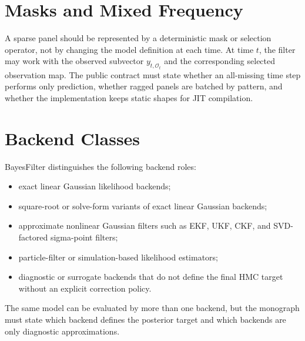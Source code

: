 \section{Masks and Mixed Frequency}
\label{sec:bf-masks-mixed-frequency-contract}

A sparse panel should be represented by a deterministic mask or selection
operator, not by changing the model definition at each time.  At time $t$, the
filter may work with the observed subvector $y_{t,\mathcal{O}_t}$ and the
corresponding selected observation map.  The public contract must state whether
an all-missing time step performs only prediction, whether ragged panels are
batched by pattern, and whether the implementation keeps static shapes for JIT
compilation.

\section{Backend Classes}
\label{sec:bf-backend-classes}

BayesFilter distinguishes the following backend roles:
\begin{itemize}
  \item exact linear Gaussian likelihood backends;
  \item square-root or solve-form variants of exact linear Gaussian backends;
  \item approximate nonlinear Gaussian filters such as EKF, UKF, CKF, and
    SVD-factored sigma-point filters;
  \item particle-filter or simulation-based likelihood estimators;
  \item diagnostic or surrogate backends that do not define the final HMC
    target without an explicit correction policy.
\end{itemize}
The same model can be evaluated by more than one backend, but the monograph
must state which backend defines the posterior target and which backends are
only diagnostic approximations.
